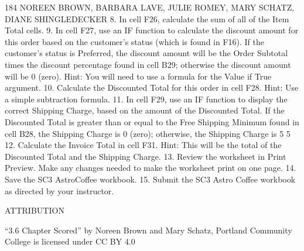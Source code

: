 184 NOREEN BROWN, BARBARA LAVE, JULIE ROMEY, MARY SCHATZ, DIANE SHINGLEDECKER
8. In cell F26, calculate the sum of all of the Item Total cells.
9. In cell F27, use an IF function to calculate the discount amount for this order based on the
customer’s status (which is found in F16). If the customer’s status is Preferred, the discount
amount will be the Order Subtotal times the discount percentage found in cell B29; otherwise
the discount amount will be 0 (zero). Hint: You will need to use a formula for the Value if True
argument.
10. Calculate the Discounted Total for this order in cell F28. Hint: Use a simple subtraction formula.
11. In cell F29, use an IF function to display the correct Shipping Charge, based on the amount of
the Discounted Total. If the Discounted Total is greater than or equal to the Free Shipping
Minimum found in cell B28, the Shipping Charge is 0 (zero); otherwise, the Shipping Charge is
5%
5%
12. Calculate the Invoice Total in cell F31. Hint: This will be the total of the Discounted Total and the
Shipping Charge.
13. Review the worksheet in Print Preview. Make any changes needed to make the worksheet print
on one page.
14. Save the SC3 AstroCoffee workbook.
15. Submit the SC3 Astro Coffee workbook as directed by your instructor.

ATTRIBUTION

“3.6 Chapter Scored” by Noreen Brown and Mary Schatz, Portland Community College is licensed
under CC BY 4.0




